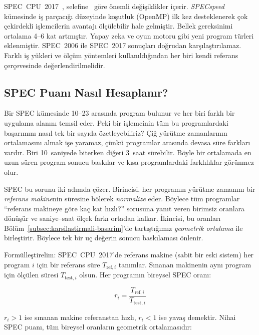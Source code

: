 \begin{bilginot}
SPEC~CPU~2017~\cite{bucek2018}, selefine~\cite{henning2006} göre önemli değişiklikler içerir. \emph{SPECspeed} kümesinde iş parçacığı düzeyinde koşutluk (OpenMP) ilk kez desteklenerek çok çekirdekli işlemcilerin avantajı ölçülebilir hale gelmiştir. Bellek gereksinimi ortalama 4--6 kat artmıştır. Yapay zeka ve oyun motoru gibi yeni program türleri eklenmiştir. SPEC~2006 ile SPEC~2017 sonuçları doğrudan karşılaştırılamaz. Farklı iş yükleri ve ölçüm yöntemleri kullanıldığından her biri kendi referans çerçevesinde değerlendirilmelidir.
\end{bilginot}

\subsection{SPEC Puanı Nasıl Hesaplanır?}
\label{subsec:spec-puan-hesaplama}

Bir SPEC kümesinde 10--23 arasında program bulunur ve her biri farklı bir uygulama alanını temsil eder. Peki bir işlemcinin tüm bu programlardaki başarımını nasıl tek bir sayıda özetleyebiliriz? Çiğ yürütme zamanlarının ortalamasını almak işe yaramaz, çünkü programlar arasında devasa süre farkları vardır. Biri 10~saniyede biterken diğeri 3~saat sürebilir. Böyle bir ortalamada en uzun süren program sonucu baskılar ve kısa programlardaki farklılıklar görünmez olur.

SPEC bu sorunu iki adımda çözer. Birincisi, her programın yürütme zamanını bir \emph{referans makine}nin süresine bölerek \emph{normalize} eder. Böylece tüm programlar ``referans makineye göre kaç kat hızlı?'' sorusuna yanıt veren birimsiz oranlara dönüşür ve saniye--saat ölçek farkı ortadan kalkar. İkincisi, bu oranları Bölüm~\ref{subsec:karsilastirmali-basarim}'de tartıştığımız \emph{geometrik ortalama} ile birleştirir. Böylece tek bir uç değerin sonucu baskılaması önlenir.

Formülleştirelim: SPEC~CPU~2017'de referans makine (sabit bir eski sistem) her program $i$ için bir referans süre $T_{\text{ref},i}$ tanımlar. Sınanan makinenin aynı program için ölçülen süresi $T_{\text{test},i}$ olsun. Her programın bireysel SPEC oranı:

\begin{equation}
r_i = \frac{T_{\text{ref},i}}{T_{\text{test},i}}
\label{eq:spec-oran}
\end{equation}

\noindent $r_i > 1$ ise sınanan makine referanstan hızlı, $r_i < 1$ ise yavaş demektir. Nihai SPEC puanı, tüm bireysel oranların geometrik ortalamasıdır:

